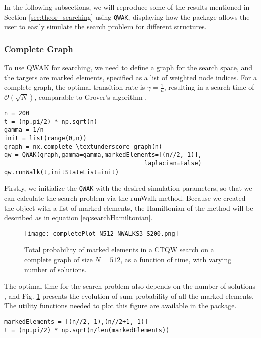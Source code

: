 \documentclass[main.tex]{subfiles}
\begin{document}
In the following subsections, we will reproduce some of the results mentioned
in Section \ref{sec:theor_searching} using \texttt{QWAK}, displaying how the
package allows the user to easily simulate the search problem for different
structures.

\subsubsection{Complete Graph}
To use QWAK for searching, we need to define a graph for the search space, and
the targets are marked elements, specified as a list of weighted node indices.
For a complete graph, the optimal transition rate is \(\gamma = \frac{1}{n}\),
resulting in a search time of \(\mathcal{O}(\sqrt{N})\), comparable to Grover's
algorithm \cite{farhi1996, childs2004}.

\begin{lstlisting}[style=code,escapeinside={__}]
n = 200
t = (np.pi/2) * np.sqrt(n)
gamma = 1/n
init = list(range(0,n))
graph = nx.complete_\textunderscore_graph(n)
qw = QWAK(graph,gamma=gamma,markedElements=[(n//2,-1)],
                                       laplacian=False)
qw.runWalk(t,initStateList=init)
\end{lstlisting}

Firstly, we initialize the \texttt{QWAK} with the desired simulation
parameters, so that we can calculate the search problem via the runWalk method.
Because we created the object with a list of marked elements, the Hamiltonian
of the method will be described as in equation
\eqref{eq:searchHamiltonian}.\par

\begin{figure}[!h]
    \centering
    \texttt{[image: completePlot\_N512\_NWALKS3\_S200.png]}
    \caption{Total probability of marked elements in a CTQW search on a
    complete graph of size $N=512$, as a function of time, with varying number
    of solutions.} 
    \label{fig:multipleElementCompleteGraph}
\end{figure}

The optimal time for the search problem also depends on the number of solutions
\cite{boyer1996,Lugao2022}, and Fig. \ref{fig:multipleElementCompleteGraph}
presents the evolution of sum probability of all the marked elements. The
utility functions needed to plot this figure are available in the package. 

\begin{lstlisting}[style=code]
markedElements = [(n//2,-1),(n//2+1,-1)]
t = (np.pi/2) * np.sqrt(n/len(markedElements))
\end{lstlisting}
\end{document}
